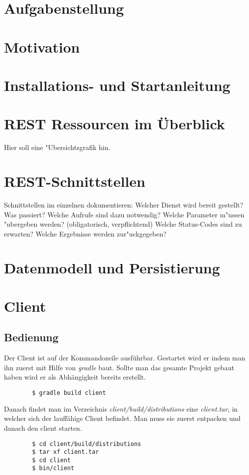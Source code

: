 \documentclass[12pt]{scrartcl}
\begin{document}
\chapter{Aufgabenstellung}
\chapter{Motivation}
\chapter{Installations- und Startanleitung}
\chapter{REST Ressourcen im Überblick}
Hier soll eine "Ubersichtsgrafik hin.
\chapter{REST-Schnittstellen}
 Schnittstellen im einzelnen dokumentieren:
 Welcher Dienst wird bereit gestellt? Was passiert?
 Welche Aufrufe sind dazu notwendig?
 Welche Parameter m"ussen "ubergeben werden? (obligatorisch, verpflichtend)
 Welche Status-Codes sind zu erwarten?
 Welche Ergebnisse werden zur"uckgegeben? 
\chapter{Datenmodell und Persistierung}
\chapter{Client}

\section{Bedienung}

	Der Client ist auf der Kommandozeile ausführbar. Gestartet wird er indem man ihn zuerst mit Hilfe von \emph{gradle} baut. Sollte man das gesamte Projekt gebaut haben wird er als Abhängigkeit bereits erstellt.
	\begin{verbatim}
		$ gradle build client
	\end{verbatim}
	
	Danach findet man im Verzeichnis \emph{client/build/distributions} eine \emph{client.tar}, in welcher sich der lauffähige Client befindet. Man muss sie zuerst entpacken und danach den client starten.
	
	\begin{verbatim}
		$ cd client/build/distributions
		$ tar xf client.tar
		$ cd client
		$ bin/client
	\end{verbatim}
	
\end{document}
